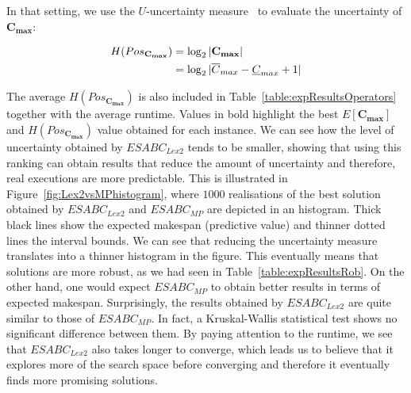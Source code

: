 \documentclass[icae]{iosart2x}
\newcommand{\reviewed}[1]{#1} %
\begin{document}
In that setting, we use the $U$-uncertainty measure~\cite{Klir2001} to evaluate the uncertainty of $\mathbf{C_{max}}$:

\begin{align}
H(Pos_{\mathbf{C_{max}}}) & = \log_2 |\mathbf{C_{max}}| \notag \\ & =\log_2 |\overline{C}_{max}-\underline{C}_{max}+1|
\end{align}

The average $H(Pos_{\mathbf{C_{max}}})$ is also included in Table~\ref{table:expResultsOperators} together with the average runtime. \reviewed{Values in bold highlight the best $E[\mathbf{C_{max}}]$ and $H(Pos_{\mathbf{C_{max}}})$ value obtained for each instance.} We can see how the level of uncertainty obtained by $ESABC_{Lex2}$ tends to be smaller, showing that using this ranking can obtain results that reduce the amount of uncertainty and therefore, real executions are more predictable. This is illustrated in Figure~\ref{fig:Lex2vsMPhistogram}, where $1000$ realisations of the best solution obtained by $ESABC_{Lex2}$ and $ESABC_{MP}$ are depicted in an histogram. \reviewed{Thick black} lines show the expected makespan (predictive value) and \reviewed{thinner dotted lines} the interval bounds. We can see that reducing the uncertainty measure translates into a thinner histogram in the figure. This eventually means that solutions are more robust, as we had seen in Table~\ref{table:expResultsRob}. On the other hand, one would expect $ESABC_{MP}$ to obtain better results in terms of expected makespan. Surprisingly, the results obtained by $ESABC_{Lex2}$ are quite similar to those of $ESABC_{MP}$. In fact, a Kruskal-Wallis statistical test shows no significant difference between them. By paying attention to the runtime, we see that $ESABC_{Lex2}$ also takes longer to converge, which leads us to believe that it explores more of the search space before converging and therefore it eventually finds more promising solutions.
\end{document}
